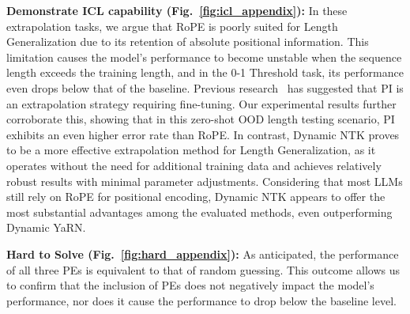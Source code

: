 \documentclass[letterpaper]{article} %
\begin{document}
\textbf{Demonstrate ICL capability (Fig.~\ref{fig:icl_appendix}):} In these extrapolation tasks, we argue that RoPE is poorly suited for Length Generalization due to its retention of absolute positional information. This limitation causes the model's performance to become unstable when the sequence length exceeds the training length, and in the 0-1 Threshold task, its performance even drops below that of the baseline. Previous research~\cite{chen-2023-extending, kaiokendev-2023-superhot} has suggested that PI is an extrapolation strategy requiring fine-tuning. Our experimental results further corroborate this, showing that in this zero-shot OOD length testing scenario, PI exhibits an even higher error rate than RoPE. In contrast, Dynamic NTK proves to be a more effective extrapolation method for Length Generalization, as it operates without the need for additional training data and achieves relatively robust results with minimal parameter adjustments. Considering that most LLMs still rely on RoPE for positional encoding, Dynamic NTK appears to offer the most substantial advantages among the evaluated methods, even outperforming Dynamic YaRN.

\textbf{Hard to Solve (Fig.~\ref{fig:hard_appendix}):} As anticipated, the performance of all three PEs is equivalent to that of random guessing. This outcome allows us to confirm that the inclusion of PEs does not negatively impact the model's performance, nor does it cause the performance to drop below the baseline level.
\end{document}
